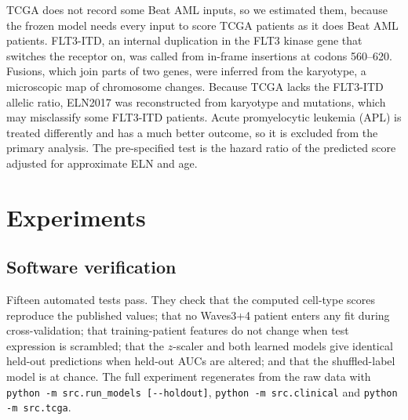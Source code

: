 \documentclass[11pt,logo,nonumbering]{preprint}
\newcommand{\z}{z}
\begin{document}
TCGA does not record some Beat AML inputs, so we estimated them, because the frozen model needs every input to score TCGA patients as it does Beat AML patients. FLT3-ITD, an internal duplication in the FLT3 kinase gene that switches the receptor on, was called from in-frame insertions at codons 560--620. Fusions, which join parts of two genes, were inferred from the karyotype, a microscopic map of chromosome changes. Because TCGA lacks the FLT3-ITD allelic ratio, ELN2017 was reconstructed from karyotype and mutations, which may misclassify some FLT3-ITD patients. Acute promyelocytic leukemia (APL) is treated differently and has a much better outcome, so it is excluded from the primary analysis. The pre-specified test is the hazard ratio of the predicted score adjusted for approximate ELN and age.

\section{Experiments}
\subsection{Software verification}
Fifteen automated tests pass. They check that the computed cell-type scores reproduce the published values; that no Waves3+4 patient enters any fit during cross-validation; that training-patient features do not change when test expression is scrambled; that the $\z$-scaler and both learned models give identical held-out predictions when held-out AUCs are altered; and that the shuffled-label model is at chance. The full experiment regenerates from the raw data with \texttt{python -m src.run\_models [-{}-holdout]}, \texttt{python -m src.clinical} and \texttt{python -m src.tcga}.
\end{document}
